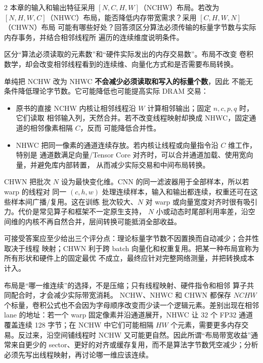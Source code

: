 \begin{solutionexercise}{2}
\problemheading 本章的输入和输出特征采用 $[N,C,H,W]$（NCHW）布局。若改为
$[N,H,W,C]$（NHWC）布局，能否降低内存带宽需求？采用 $[C,H,W,N]$（CHWN）布局
可能有哪些好处？回答须区分算法必须传输的标量字节数与实际内存事务，并结合相邻线程所
遍历的连续维度说明条件。

\approachheading 区分“算法必须读取的元素数”和“硬件实际发出的内存交易数”。布局不改变
卷积数学，却会改变相邻线程看到的连续维、向量化方式和是否需要布局转换。

\answerheading 单纯把 NCHW 改为 NHWC \textbf{不会减少必须读取和写入的标量个数}，因此
不能无条件降低理论字节数。它可能降低也可能提高实际 DRAM 交易：
\begin{itemize}
  \item 原书的直接 NCHW 内核让相邻线程沿 $W$ 计算相邻输出；固定 $n,c,p,q$ 时，它们读取
  相邻输入列，天然合并。若不改变线程映射却换成 NHWC，固定通道的相邻像素相隔 $C$，反而
  可能降低合并性。
  \item NHWC 把同一像素的通道连续存放。若内核让线程或向量指令沿 $C$ 维工作，特别是
  通道数满足向量/Tensor Core 对齐时，可以合并通道加载、使用宽向量，并避免库内部转置，
  从而减少实际交易和中间布局转换。
\end{itemize}

CHWN 把批次 $N$ 设为最快变化维。CNN 的同一滤波器用于全部样本，所以若 warp 的线程对
同一 $(c,h,w)$ 处理连续样本，输入和输出都连续，权重还可在这些样本间广播/复用。这在训练
批次较大、$N$ 对 warp 或向量宽度对齐时很有吸引力。代价是常见算子和框架不一定原生支持，
$N$ 小或动态时尾部利用率差，沿空间维的内核不再自然合并，层间转换可能抵消全部收益。

可接受答案应至少给出三个评分点：理论标量字节数不因置换而自动减少；合并性取决于线程
映射；CHWN 利于跨 batch 向量化和权重复用。把某一种布局宣称为所有形状和硬件上的固定最优
不成立，最终应针对完整网络测量，并把转换成本计入。

\conclusionheading 布局是“哪一维连续”的选择，不是压缩；只有线程映射、硬件指令和相邻
算子共同配合时，才会减少实际带宽消耗。
\discussionheading
{}
NCHW、NHWC 和 CHWN 都保存 $NCHW$ 个标量，卷积公式也不会因为字母顺序改变而少读一个逻辑元素。差别出现在相邻 lane 的地址：若一个 warp 固定像素并沿通道展开，NHWC 让 32 个 FP32 通道覆盖连续 128 字节；在 NCHW 中它们可能相隔 $HW$ 个元素，需要更多内存交易。反过来，沿空间铺线程时 NCHW 又可能更自然。因此所谓“布局带宽收益”通常来自更少的 sector、更好的对齐或缓存复用，而不是算法字节数凭空减少；分析必须先写出线程映射，再讨论哪一维应该连续。


\end{solutionexercise}

